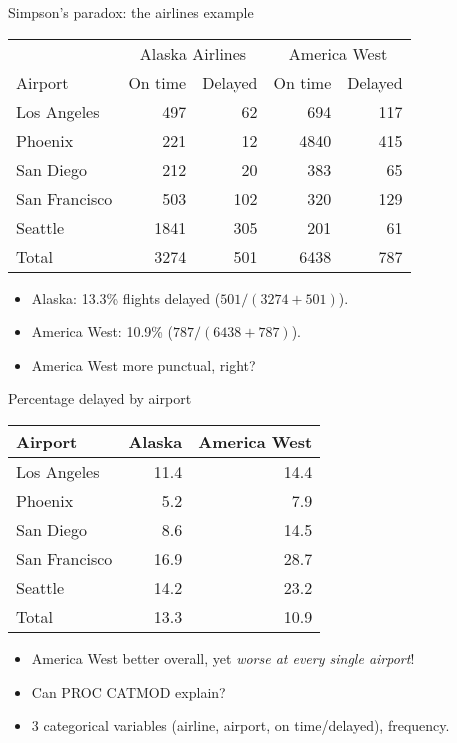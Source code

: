 \documentclass[pdf]{prosper}
\begin{document}
\begin{slide}{Simpson's paradox: the airlines example}

  \begin{tabular}{|l|rr|rr|}
    \hline
    & \multicolumn{2}{|c|}{Alaska Airlines} & 
    \multicolumn{2}{|c|}{America West}\\
    Airport & On time & Delayed & On time & Delayed\\
    \hline
    Los Angeles & 497 & 62 & 694 & 117\\
    Phoenix & 221 & 12 & 4840 & 415\\
    San Diego & 212 & 20 & 383 & 65\\
    San Francisco & 503 & 102 & 320 & 129 \\
    Seattle & 1841 & 305 & 201 & 61\\
    \hline
    Total & 3274 & 501 & 6438 & 787\\
    \hline
  \end{tabular}

  \begin{itemize}
  \item Alaska: 13.3\% flights delayed ($501/(3274+501)$).
  \item America West: 10.9\% ($787/(6438+787)$).
  \item America West more punctual, right?
  \end{itemize}
  
\end{slide}

\begin{slide}{Percentage delayed by airport}

  \begin{tabular}{|l|rr|}
    \hline
    Airport & Alaska & America West\\
    \hline
    Los Angeles & 11.4 & 14.4\\
    Phoenix & 5.2 & 7.9\\
    San Diego & 8.6 & 14.5\\
    San Francisco & 16.9 & 28.7\\
    Seattle & 14.2 & 23.2 \\
    \hline
    Total & 13.3 & 10.9 \\
    \hline
    
  \end{tabular}

  \begin{itemize}
  \item America West better overall, yet {\em worse at every single airport}!
  \item Can PROC CATMOD explain?
  \item 3 categorical variables (airline, airport, on time/delayed), frequency.
  \end{itemize}
  
\end{slide}
\end{document}
